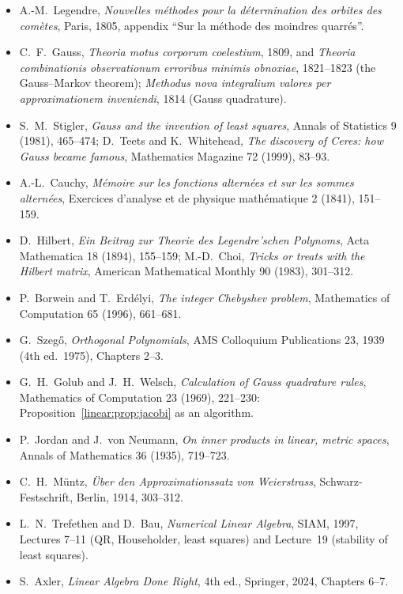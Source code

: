 \begin{itemize}
\item A.-M.~Legendre, \emph{Nouvelles m\'ethodes pour la d\'etermination des orbites des com\`etes}, Paris, 1805, appendix
``Sur la m\'ethode des moindres quarr\'es''.
\item C.~F.~Gauss, \emph{Theoria motus corporum coelestium}, 1809, and \emph{Theoria combinationis observationum erroribus
minimis obnoxiae}, 1821--1823 (the Gauss--Markov theorem); \emph{Methodus nova integralium valores per approximationem
inveniendi}, 1814 (Gauss quadrature).
\item S.~M.~Stigler, \emph{Gauss and the invention of least squares}, Annals of Statistics 9 (1981), 465--474; D.~Teets and
K.~Whitehead, \emph{The discovery of Ceres: how Gauss became famous}, Mathematics Magazine 72 (1999), 83--93.
\item A.-L.~Cauchy, \emph{M\'emoire sur les fonctions altern\'ees et sur les sommes altern\'ees}, Exercices d'analyse et de
physique math\'ematique 2 (1841), 151--159.
\item D.~Hilbert, \emph{Ein Beitrag zur Theorie des Legendre'schen Polynoms}, Acta Mathematica 18 (1894), 155--159;
M.-D.~Choi, \emph{Tricks or treats with the Hilbert matrix}, American Mathematical Monthly 90 (1983), 301--312.
\item P.~Borwein and T.~Erd\'elyi, \emph{The integer Chebyshev problem}, Mathematics of Computation 65 (1996), 661--681.
\item G.~Szeg\H{o}, \emph{Orthogonal Polynomials}, AMS Colloquium Publications 23, 1939 (4th ed.\ 1975), Chapters 2--3.
\item G.~H.~Golub and J.~H.~Welsch, \emph{Calculation of Gauss quadrature rules}, Mathematics of Computation 23 (1969),
221--230: Proposition~\ref{linear:prop:jacobi} as an algorithm.
\item P.~Jordan and J.~von Neumann, \emph{On inner products in linear, metric spaces}, Annals of Mathematics 36 (1935),
719--723.
\item C.~H.~M\"untz, \emph{\"Uber den Approximationssatz von Weierstrass}, Schwarz-Festschrift, Berlin, 1914, 303--312.
\item L.~N.~Trefethen and D.~Bau, \emph{Numerical Linear Algebra}, SIAM, 1997, Lectures 7--11 (QR, Householder, least
squares) and Lecture~19 (stability of least squares).
\item S.~Axler, \emph{Linear Algebra Done Right}, 4th ed., Springer, 2024, Chapters 6--7.
\end{itemize}
